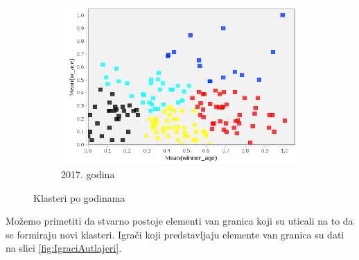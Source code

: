 \documentclass[a4paper]{article}
\begin{document}
\begin{figure}[H]
	\vspace{0.5cm}
	\begin{subfigure}[h]{\textwidth}
		\begin{center}
			\includegraphics[scale=0.40]{Klasterovanje/ScatterPlot_KMeans2017.png}
		\end{center}
		\caption{2017. godina}
		\label{KNIME_ScatterPlot2017}
	\end{subfigure}
	
	\caption{Klasteri po godinama}
	\label{KlasteriScatterPlot}
\end{figure}

Možemo primetiti da stvarno postoje elementi van granica koji su uticali na to da se formiraju novi klasteri. Igrači koji predstavljaju elemente van granica su dati na slici \ref{fig:IgraciAutlajeri}. 
\end{document}
